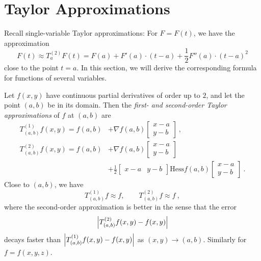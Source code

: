 \section{Taylor Approximations}

\begin{remark}
Recall single-variable Taylor approximations: For $F=F(t)$, we have the approximation
\[ F(t) \approx T_a^{(2)}F(t) = F(a) + F'(a)\cdot(t-a) + \frac{1}{2} F''(a)\cdot(t-a)^2 \]
close to the point $t=a$. In this section, we will derive the corresponding formula for functions of several variables.
\end{remark}

\begin{theorem}
Let $f(x,y)$ have continuous partial derivatives of order up to $2$, and let the point $(a,b)$ be in its domain. Then the \emph{first- and second-order Taylor approximations} of $f$ at $(a,b)$ are
\begin{equation}
\label{eq:TA}
\begin{split}
T_{(a,b)}^{(1)} f (x,y) = 
f(a,b) & + \nabla f (a,b) \begin{bmatrix} x-a \\ y-b \end{bmatrix} \:, \\
T_{(a,b)}^{(2)} f (x,y) = 
f(a,b) & + \nabla f (a,b) \begin{bmatrix} x-a \\ y-b \end{bmatrix} \\
 & + \frac{1}{2} \begin{bmatrix} x-a & y-b \end{bmatrix}
\mathrm{Hess} f (a,b) \begin{bmatrix} x-a \\ y-b \end{bmatrix} \:.
\end{split}
\end{equation}
Close to $(a,b)$, we have
\[ T_{(a,b)}^{(1)} f \approx f, \qquad T_{(a,b)}^{(2)} f \approx f \:, \]
where the second-order approximation is better in the sense that the error \[\left| T_{(a,b)}^{(2)}f(x,y)-f(x,y) \right|\]
decays faster than $\left| T_{(a,b)}^{(1)}f(x,y)-f(x,y) \right|$ as $(x,y)\to(a,b)$. Similarly for $f=f(x,y,z)$.
\end{theorem}

